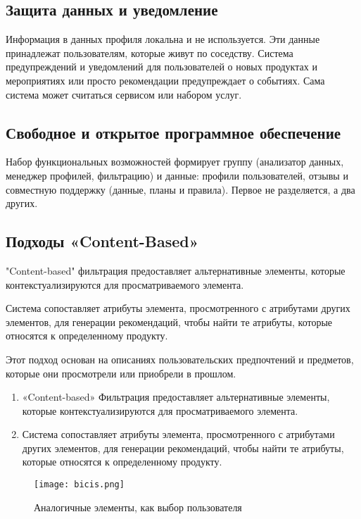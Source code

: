 \subsection{Защита данных и уведомление}
Информация в данных профиля локальна и не используется. Эти данные принадлежат пользователям, которые живут по соседству. Система предупреждений и уведомлений для пользователей о новых продуктах и мероприятиях или просто рекомендации предупреждает о событиях. Сама система может считаться сервисом или набором услуг.

\subsection{Свободное и открытое программное обеспечение}
Набор функциональных возможностей формирует группу (анализатор данных, менеджер профилей, фильтрацию) и данные: профили пользователей, отзывы и совместную поддержку (данные, планы и правила). Первое не разделяется, а два других.

\newpage
\subsection{Подходы «Content-Based»}
"Content-based" фильтрация предоставляет альтернативные элементы, которые контекстуализируются для просматриваемого элемента.

Система сопоставляет атрибуты элемента, просмотренного с атрибутами других элементов, для генерации рекомендаций, чтобы найти те атрибуты, которые относятся к определенному продукту.

Этот подход основан на описаниях пользовательских предпочтений и предметов, которые они просмотрели или приобрели в прошлом.


\begin{enumerate}
\item «Content-based» Фильтрация  предоставляет альтернативные элементы, которые контекстуализируются для просматриваемого элемента.
\item Система сопоставляет атрибуты элемента, просмотренного с атрибутами других элементов, для генерации рекомендаций, чтобы найти те атрибуты, которые относятся к определенному продукту.
\end{enumerate}

\begin{figure}[h]
  \centering
  \texttt{[image: bicis.png]}
  \caption{Аналогичные элементы, как выбор пользователя}
  \label{image:scheme5}
\end{figure}



